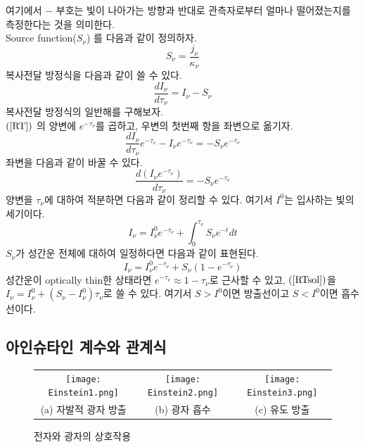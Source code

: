 여기에서 $-$ 부호는 빛이 나아가는 방향과 반대로 관측자로부터 얼마나 떨어졌는지를 측정한다는 것을 의미한다.\\
Source function($S_\nu$) 를 다음과 같이 정의하자.
\begin{equation}
S_\nu = \frac{j_\nu}{\kappa_\nu}
\end{equation}
복사전달 방정식을 다음과 같이 쓸 수 있다. 
\begin{equation}
\frac{dI_\nu}{d\tau_\nu} = I_\nu - S_\nu \label{RT}
\end{equation}
복사전달 방정식의 일반해를 구해보자. \\
$(\ref{RT})$ 의 양변에 $e^{-\tau_\nu}$를 곱하고, 우변의 첫번째 항을 좌변으로 옮기자.
\begin{equation*}
	\frac{dI_\nu}{d\tau_\nu} e^{-\tau_\nu} - I_\nu e^{-\tau_\nu} = - S_\nu e^{-\tau_\nu}
\end{equation*}
좌변을 다음과 같이 바꿀 수 있다. 
\begin{equation*}
	\frac{d \left(I_\nu e^{-\tau_\nu}\right)}{d\tau_\nu} = - S_\nu e^{-\tau_\nu}
\end{equation*}
양변을 $\tau_\nu$에 대하여 적분하면 다음과 같이 정리할 수 있다. 여기서 $I^0$는 입사하는 빛의 세기이다.
\begin{equation*}
	I_\nu = I_\nu ^0 e^{-\tau_\nu} + \int_{0}^{\tau_\nu} S_\nu e^{-t}dt
\end{equation*}
$S_\nu$가 성간운 전체에 대하여 일정하다면 다음과 같이 표현된다.
\begin{equation}
I_\nu = I_\nu ^0 e^{-\tau_\nu} + S_\nu \left(1-e^{-\tau_\nu}\right) \label{RTsol}
\end{equation}
성간운이 optically thin한 상태라면 $e^{-\tau_\nu}\approx 1-\tau_\nu$로 근사할 수 있고, $(\ref{RTsol})$을 $I_\nu = I_\nu ^0 + \left(S_\nu - I_\nu ^0\right) \tau_\nu$로 쓸 수 있다. 여기서 $S > I^0$이면 방출선이고 $S < I^0$이면 흡수선이다.\\


\subsection{아인슈타인 계수와 관계식}

\begin{figure}[h]
	\begin{center}
		\begin{tabular}{ccc}
			\centering
			\texttt{[image: Einstein1.png]} & \texttt{[image: Einstein2.png]} & \texttt{[image: Einstein3.png]}\\
			(a) 자발적 광자 방출 & (b) 광자 흡수 & (c) 유도 방출\\[6pt]
		\end{tabular}
	\end{center}
	\caption{전자와 광자의 상호작용}
\end{figure}

